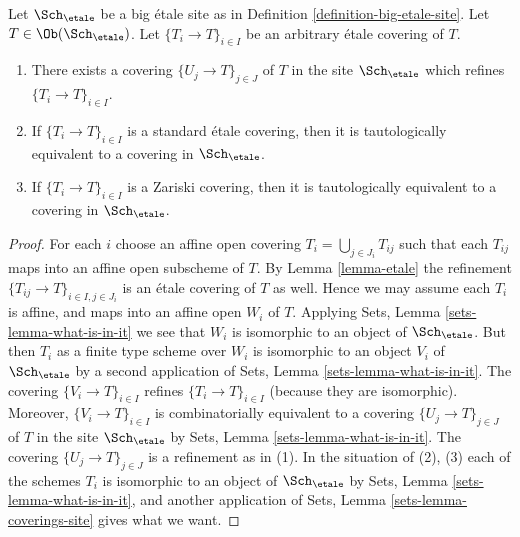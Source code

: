 \begin{lemma}
\label{lemma-etale-induced}
Let $\Sch_\etale$ be a big \'etale site as in
Definition \ref{definition-big-etale-site}.
Let $T \in \Ob(\Sch_\etale)$.
Let $\{T_i \to T\}_{i \in I}$ be an arbitrary \'etale covering of $T$.
\begin{enumerate}
\item There exists a covering $\{U_j \to T\}_{j \in J}$ of $T$ in the site
$\Sch_\etale$ which refines $\{T_i \to T\}_{i \in I}$.
\item If $\{T_i \to T\}_{i \in I}$ is a standard \'etale covering, then
it is tautologically equivalent to a covering in $\Sch_\etale$.
\item If $\{T_i \to T\}_{i \in I}$ is a Zariski covering, then
it is tautologically equivalent to a covering in $\Sch_\etale$.
\end{enumerate}
\end{lemma}

\begin{proof}
For each $i$ choose an affine open covering $T_i = \bigcup_{j \in J_i} T_{ij}$
such that each $T_{ij}$ maps into an affine open subscheme of $T$. By
Lemma \ref{lemma-etale}
the refinement $\{T_{ij} \to T\}_{i \in I, j \in J_i}$ is an \'etale covering
of $T$ as well. Hence we may assume each $T_i$ is affine, and maps into
an affine open $W_i$ of $T$. Applying
Sets, Lemma \ref{sets-lemma-what-is-in-it}
we see that $W_i$ is isomorphic to an object of $\Sch_\etale$.
But then $T_i$ as a finite type scheme over $W_i$
is isomorphic to an object $V_i$ of $\Sch_\etale$ by a second
application of
Sets, Lemma \ref{sets-lemma-what-is-in-it}.
The covering $\{V_i \to T\}_{i \in I}$ refines $\{T_i \to T\}_{i \in I}$
(because they are isomorphic).
Moreover, $\{V_i \to T\}_{i \in I}$ is combinatorially equivalent to a
covering $\{U_j \to T\}_{j \in J}$ of $T$ in the site
$\Sch_\etale$ by
Sets, Lemma \ref{sets-lemma-what-is-in-it}.
The covering $\{U_j \to T\}_{j \in J}$ is a refinement as in (1).
In the situation of (2), (3) each of the
schemes $T_i$ is isomorphic to an object of $\Sch_\etale$ by
Sets, Lemma \ref{sets-lemma-what-is-in-it},
and another application of
Sets, Lemma \ref{sets-lemma-coverings-site}
gives what we want.
\end{proof}

